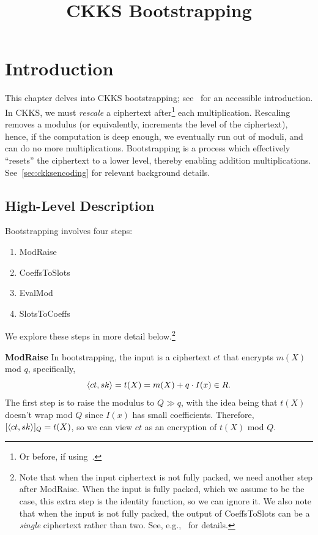 \documentclass[../fheimpl.tex]{subfiles}
\begin{document}
    \ifcompileasbook
    \else
    	\title{CKKS Bootstrapping}
        \hypersetup{pageanchor=false}
        \maketitle
        \listoffixmes
        \tableofcontents
        \compileasbooktrue
        \hypersetup{pageanchor=true}
    \fi
    \section{Introduction}
    This chapter delves into CKKS bootstrapping; see~\cite{cryptoeprint:2023/149} for an accessible introduction. In CKKS, we must \emph{rescale} a ciphertext after\footnote{Or before, if using~\cite{cryptoeprint:2020/1118}.} each multiplication. Rescaling removes a modulus (or equivalently, increments the level of the ciphertext), hence, if the computation is deep enough, we eventually run out of moduli, and can do no more multiplications. Bootstrapping is a process which effectively ``resets'' the ciphertext to a lower level, thereby enabling addition multiplications. See~\cref{sec:ckksencoding} for relevant background details.
    
    \subsection{High-Level Description}
    Bootstrapping involves four steps:
    \begin{enumerate}
        \item ModRaise
        \item CoeffsToSlots
        \item EvalMod
        \item SlotsToCoeffs
    \end{enumerate}
    We explore these steps in more detail below.\footnote{Note that when the input ciphertext is not fully packed, we need another step after ModRaise. When the input is fully packed, which we assume to be the case, this extra step is the identity function, so we can ignore it. We also note that when the input is not fully packed, the output of CoeffsToSlots can be a \emph{single} ciphertext rather than two. See, e.g.,~\cite{cryptoeprint:2018/1043} for details.}
    
    \textbf{ModRaise} In bootstrapping, the input is a ciphertext $ct$ that encrypts $m(X)$ mod $q$, specifically,
    \[\langle ct, sk\rangle = t(X) = m(X)+q\cdot I(x)\in R.\]
    The first step is to raise the modulus to $Q \gg q$, with the idea being that $t(X)$ doesn't wrap mod $Q$ since $I(x)$ has small coefficients. Therefore, $[\langle ct, sk\rangle]_Q = t(X)$, so we can view $ct$ as an encryption of $t(X)$ mod $Q$. 
    
\end{document}
